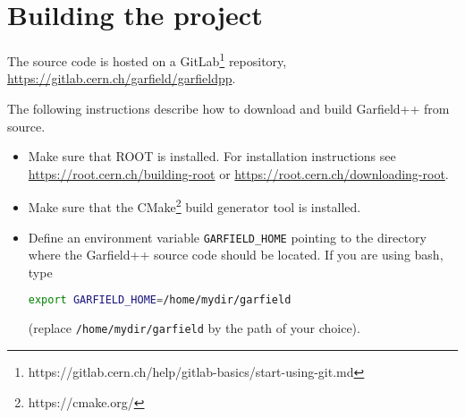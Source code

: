 
\section{Building the project}

The source code is hosted on a GitLab\footnote{https://gitlab.cern.ch/help/gitlab-basics/start-using-git.md} repository,
\url{https://gitlab.cern.ch/garfield/garfieldpp}.

The following instructions describe how to download 
and build Garfield++ from source. 
\begin{itemize}
  \item
  Make sure that ROOT is installed. For installation instructions 
  see \url{https://root.cern.ch/building-root} or
  \url{https://root.cern.ch/downloading-root}.
  \item
  Make sure that the CMake\footnote{https://cmake.org/} 
  build generator tool is installed.
  \item
  Define an environment variable \texttt{GARFIELD\_HOME} 
  pointing to the directory where the Garfield++ source code
  should be located.
  If you are using bash, type
\begin{lstlisting}[language=bash]
export GARFIELD_HOME=/home/mydir/garfield
\end{lstlisting} 
  (replace \texttt{/home/mydir/garfield} by the path of your choice).
  

\end{itemize}
